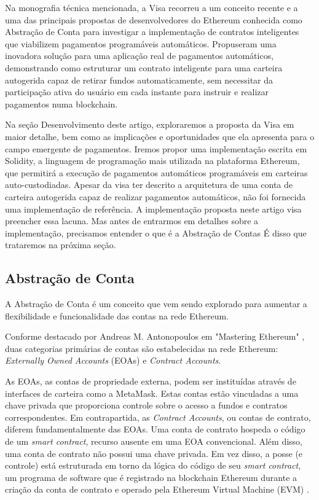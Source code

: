 \documentclass[12pt]{article}
\begin{document}
Na monografia técnica mencionada, a Visa recorreu a um conceito recente e a uma das principais
propostas de desenvolvedores do Ethereum conhecida como Abstração de Conta para investigar a
implementação de contratos inteligentes que viabilizem pagamentos programáveis automáticos.
Propuseram uma inovadora solução para uma aplicação real de pagamentos automáticos, demonstrando
como estruturar um contrato inteligente para uma carteira autogerida capaz de retirar fundos
automaticamente, sem necessitar da participação ativa do usuário em cada instante para instruir e
realizar pagamentos numa blockchain.

Na seção Desenvolvimento deste artigo, exploraremos a proposta da Visa em maior detalhe, bem como
as implicações e oportunidades que ela apresenta para o campo emergente de pagamentos. Iremos
propor uma implementação escrita em Solidity, a linguagem de programação mais utilizada na
plataforma Ethereum, que permitirá a execução de pagamentos automáticos programáveis em carteiras
auto-custodiadas. Apesar da visa ter descrito a arquitetura de uma conta de carteira autogerida
capaz de realizar pagamentos automáticos, não foi fornecida uma implementação de referência. A
implementação proposta neste artigo visa preencher essa lacuna. Mas antes de entrarmos em detalhes
sobre a implementação, precisamos entender o que é a Abstração de Contas É disso que trataremos na
próxima seção.

\subsection{Abstração de Conta}

A Abstração de Conta é um conceito que vem sendo explorado para aumentar a flexibilidade e
funcionalidade das contas na rede Ethereum.

Conforme destacado por Andreas M. Antonopoulos em "Mastering Ethereum" \cite{Antonopoulos2018},
duas categorias primárias de contas são estabelecidas na rede Ethereum: \textit{Externally Owned
  Accounts} (EOAs) e \textit{Contract Accounts}.

As EOAs, as contas de propriedade externa, podem ser instituídas através de interfaces de carteira
como a MetaMask. Estas contas estão vinculadas a uma chave privada que proporciona controle sobre o
acesso a fundos e contratos correspondentes. Em contrapartida, as \textit{Contract Accounts}, ou
contas de contrato, diferem fundamentalmente das EOAs. Uma conta de contrato hospeda o código de um
\textit{smart contract}, recurso ausente em uma EOA convencional. Além disso, uma conta de contrato
não possui uma chave privada. Em vez disso, a posse (e controle) está estruturada em torno da
lógica do código de seu \textit{smart contract}, um programa de software que é registrado na
blockchain Ethereum durante a criação da conta de contrato e operado pela Ethereum Virtual Machine
(EVM) \cite{Antonopoulos2018}.
\end{document}
